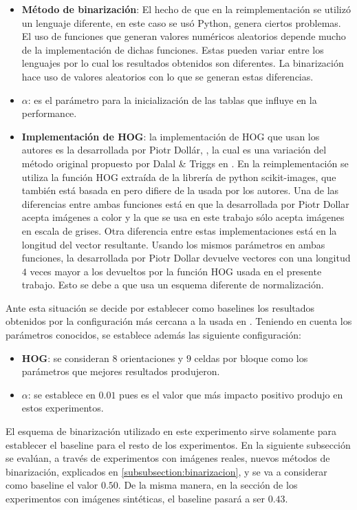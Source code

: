 	\begin{itemize}
		\item \textbf{Método de binarización}: El hecho de que en la reimplementación se utilizó un lenguaje diferente, en este caso se usó Python, genera ciertos problemas. El uso de funciones que generan valores numéricos aleatorios depende mucho de la implementación de dichas funciones. Estas pueden variar entre los lenguajes por lo cual los resultados obtenidos son diferentes. La binarización hace uso de valores aleatorios con lo que se generan estas diferencias.
		\item \textbf{$\alpha$}: es el parámetro para la inicialización de las tablas que influye en la performance.
		\item \textbf{Implementación de HOG}: la implementación de HOG que usan los autores es la desarrollada por Piotr Dollár, \cite{PiotrD}, la cual es una variación del método original propuesto por Dalal \& Triggs en \cite{DT05}. En la reimplementación se utiliza la función HOG extraída de la librería de python scikit-images, que también está basada en \cite{DT05} pero difiere de la usada por los autores. Una de las diferencias entre ambas funciones está en que la desarrollada por Piotr Dollar acepta imágenes a color y la que se usa en este trabajo sólo acepta imágenes en escala de grises. Otra diferencia entre estas implementaciones está en la longitud del vector resultante. Usando los mismos parámetros en ambas funciones, la desarrollada por Piotr Dollar devuelve vectores con una longitud $4$ veces mayor a los devueltos por la función HOG usada en el presente trabajo. Esto se debe a que usa un esquema diferente de normalización.
	\end{itemize}
	
	Ante esta situación se decide por establecer como baselines los resultados obtenidos por la configuración más cercana a la usada en \cite{wang}. Teniendo en cuenta los parámetros conocidos, se establece además las siguiente configuración:
	
	\begin{itemize}
		\item \textbf{HOG}: se consideran $8$ orientaciones y $9$ celdas por bloque como los parámetros que mejores resultados produjeron.
		\item \textbf{$\alpha$}: se establece en $0.01$ pues es el valor que más impacto positivo produjo en estos experimentos.
	\end{itemize}		
	
	El esquema de binarización utilizado en este experimento sirve solamente para establecer el baseline para el resto de los experimentos. En la siguiente subsección se evalúan, a través de experimentos con imágenes reales, nuevos métodos de binarización, explicados en \ref{subsubsection:binarizacion}, y se va a considerar como baseline el valor $0.50$. De la misma manera, en la sección de los experimentos con imágenes sintéticas, el baseline pasará a ser $0.43$.
	
